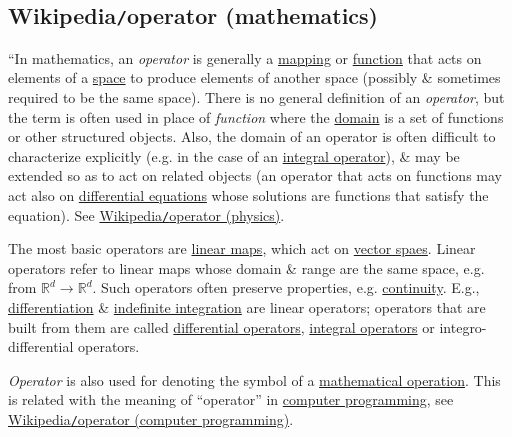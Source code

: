 \documentclass{article}
\begin{document}
\subsection{Wikipedia{\tt/}operator (mathematics)}
``In mathematics, an {\it operator} is generally a \href{https://en.wikipedia.org/wiki/Map_(mathematics)}{mapping} or \href{https://en.wikipedia.org/wiki/Function_(mathematics)}{function} that acts on elements of a \href{https://en.wikipedia.org/wiki/Space_(mathematics)}{space} to produce elements of another space (possibly \& sometimes required to be the same space). There is no general definition of an {\it operator}, but the term is often used in place of {\it function} where the \href{https://en.wikipedia.org/wiki/Domain_of_a_function}{domain} is a set of functions or other structured objects. Also, the domain of an operator is often difficult to characterize explicitly (e.g. in the case of an \href{https://en.wikipedia.org/wiki/Integral_operator}{integral operator}), \& may be extended so as to act on related objects (an operator that acts on functions may act also on \href{https://en.wikipedia.org/wiki/Differential_equation}{differential equations} whose solutions are functions that satisfy the equation). See \href{https://en.wikipedia.org/wiki/Operator_(physics)}{Wikipedia{\tt/}operator (physics)}.

The most basic operators are \href{https://en.wikipedia.org/wiki/Linear_map}{linear maps}, which act on \href{https://en.wikipedia.org/wiki/Vector_space}{vector spaes}. Linear operators refer to linear maps whose domain \& range are the same space, e.g. from $\mathbb{R}^d\to\mathbb{R}^d$. Such operators often preserve properties, e.g. \href{https://en.wikipedia.org/wiki/Continuous_function}{continuity}. E.g., \href{https://en.wikipedia.org/wiki/Differentiation_(mathematics)}{differentiation} \& \href{https://en.wikipedia.org/wiki/Indefinite_integration}{indefinite integration} are linear operators; operators that are built from them are called \href{https://en.wikipedia.org/wiki/Differential_operator}{differential operators}, \href{https://en.wikipedia.org/wiki/Integral_operator}{integral operators} or integro-differential operators.

{\it Operator} is also used for denoting the symbol of a \href{https://en.wikipedia.org/wiki/Mathematical_operation}{mathematical operation}. This is related with the meaning of ``operator'' in \href{https://en.wikipedia.org/wiki/Computer_programming}{computer programming}, see \href{https://en.wikipedia.org/wiki/Operator_(computer_programming)}{Wikipedia{\tt/}operator (computer programming)}.
	
\end{document}
